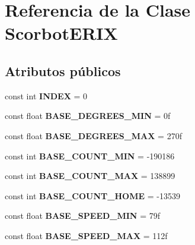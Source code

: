 \hypertarget{class_scorbot_e_r_i_x}{}\section{Referencia de la Clase Scorbot\+E\+R\+IX}
\label{class_scorbot_e_r_i_x}
\subsection*{Atributos públicos}
\begin{DoxyCompactItemize}
\item 
\mbox{\label{class_scorbot_e_r_i_x_a024acbeb40094f4a86305f41a3f3a316}} 
const int {\bfseries I\+N\+D\+EX} = 0
\item 
\mbox{\label{class_scorbot_e_r_i_x_ab76a4a8f8a1d26ba046506f378b27ca3}} 
const float {\bfseries B\+A\+S\+E\+\_\+\+D\+E\+G\+R\+E\+E\+S\+\_\+\+M\+IN} = 0f
\item 
\mbox{\label{class_scorbot_e_r_i_x_a4e98c50b8b327d0e25e0cf9be2c840c3}} 
const float {\bfseries B\+A\+S\+E\+\_\+\+D\+E\+G\+R\+E\+E\+S\+\_\+\+M\+AX} = 270f
\item 
\mbox{\label{class_scorbot_e_r_i_x_ad70b7474a6c1bb4df5246137fccdc4c1}} 
const int {\bfseries B\+A\+S\+E\+\_\+\+C\+O\+U\+N\+T\+\_\+\+M\+IN} = -\/190186
\item 
\mbox{\label{class_scorbot_e_r_i_x_a685f6fae85f78b27420c93973e40541b}} 
const int {\bfseries B\+A\+S\+E\+\_\+\+C\+O\+U\+N\+T\+\_\+\+M\+AX} = 138899
\item 
\mbox{\label{class_scorbot_e_r_i_x_acb0fc5930e94106bb9c93aad8e440740}} 
const int {\bfseries B\+A\+S\+E\+\_\+\+C\+O\+U\+N\+T\+\_\+\+H\+O\+ME} = -\/13539
\item 
\mbox{\label{class_scorbot_e_r_i_x_aa6824486370ab3b60f3229ccb205bf05}} 
const float {\bfseries B\+A\+S\+E\+\_\+\+S\+P\+E\+E\+D\+\_\+\+M\+IN} = 79f
\item 
\mbox{\label{class_scorbot_e_r_i_x_aec1e3db10ee2126d086b1f09418c3a6f}} 
const float {\bfseries B\+A\+S\+E\+\_\+\+S\+P\+E\+E\+D\+\_\+\+M\+AX} = 112f

\end{DoxyCompactItemize}
